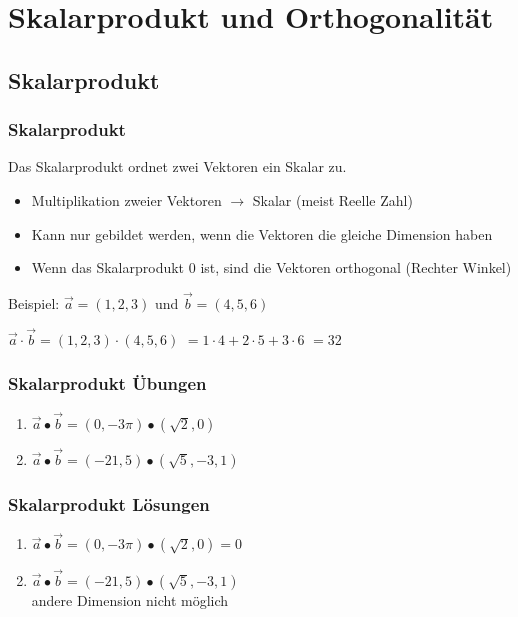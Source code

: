 \section{Skalarprodukt und Orthogonalität}

\subsection{Skalarprodukt}
\begin{frame}
    \frametitle{Skalarprodukt}
    Das Skalarprodukt ordnet zwei Vektoren ein Skalar zu.
    \begin{itemize}
        \item Multiplikation zweier Vektoren $\rightarrow$ Skalar (meist Reelle Zahl)
        \item Kann nur gebildet werden, wenn die Vektoren die gleiche Dimension haben
        \item Wenn das Skalarprodukt 0 ist, sind die Vektoren orthogonal (Rechter Winkel)
    \end{itemize}
    \vfill Beispiel: $\vec{a} = (1,2,3)$ und $\vec{b} = (4,5,6)$

    $\vec{a} \cdot \vec{b} = (1,2,3) \cdot (4,5,6)$
    $= 1 \cdot 4 + 2 \cdot 5 + 3 \cdot 6$
    $= 32$
\end{frame}


\begin{frame}
    \frametitle{Skalarprodukt Übungen}
    \begin{enumerate}
        \item $\vec{a} \bullet \vec{b} = (0, -3\pi) \bullet (\sqrt{2}, 0)$
        \item $\vec{a} \bullet \vec{b} = (-21, 5) \bullet (\sqrt{5}, -3, 1)$
    \end{enumerate}
\end{frame}

\begin{frame}
    \frametitle{Skalarprodukt Lösungen}
    \begin{enumerate}
        \item $\vec{a} \bullet \vec{b} = (0, -3\pi) \bullet (\sqrt{2}, 0) = 0$
        \item $\vec{a} \bullet \vec{b} = (-21, 5) \bullet (\sqrt{5}, -3, 1)$ \\andere Dimension nicht möglich
    \end{enumerate}
\end{frame}

